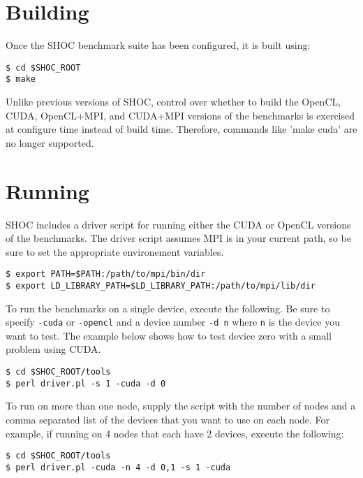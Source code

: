 \documentclass[11pt]{article}
\begin{document}
\section{Building}\label{sec:building}

Once the SHOC benchmark suite has been configured, it is built using:

\begin{Verbatim}[frame=single]
$ cd $SHOC_ROOT
$ make
\end{Verbatim}

Unlike previous versions of SHOC, control over whether to build the 
OpenCL, CUDA, OpenCL+MPI, and CUDA+MPI versions of the benchmarks is
exercised at configure time instead of build time.
Therefore, commands like 'make cuda' are no longer supported.


\section{Running}\label{sec:running}

SHOC includes a driver script for running either the CUDA or OpenCL versions
of the benchmarks. The driver script assumes MPI is in your current path,
so be sure to set the appropriate environement variables.

\begin{Verbatim}[frame=single]
$ export PATH=$PATH:/path/to/mpi/bin/dir
$ export LD_LIBRARY_PATH=$LD_LIBRARY_PATH:/path/to/mpi/lib/dir
\end{Verbatim}

To run the benchmarks on a single device, execute the following. Be sure
to specify \verb+-cuda+ or \verb+-opencl+ and a device number \verb+-d n+
where \verb+n+ is the device you want to test. The example below shows how
to test device zero with a small problem using CUDA.

\begin{Verbatim}[frame=single]
$ cd $SHOC_ROOT/tools
$ perl driver.pl -s 1 -cuda -d 0
\end{Verbatim}

To run on more than one node, supply the script with the number of nodes and 
a comma separated list of the devices that you want to use on each node. For
example, if running on 4 nodes that each have 2 devices, execute the following: 

\begin{Verbatim}[frame=single]
$ cd $SHOC_ROOT/tools
$ perl driver.pl -cuda -n 4 -d 0,1 -s 1 -cuda
\end{Verbatim}
\end{document}
